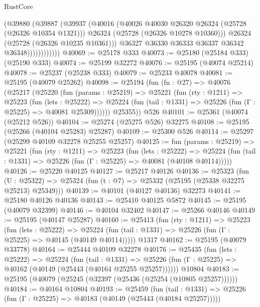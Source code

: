 \begin{lexlean}{RustCore}
\begin{coremodule}
                        (@39880
                          (@39887
                            (@39937
                              (@40016
                                (@40026 @40030 @26320 @26324 (@25728 (@26326 @10354 @1321)))
                                @26324
                                (@25728 (@26326 @10278 @10360)))
                              @26324
                              (@25728 (@26326 @10235 @10361)))
                            @36327
                            @36330
                            @36333
                            @36337
                            @36342
                            @36348))))))))))))
@40069 := @25178 @333
@40073 := @25180 (@25184 @333) (@25190 @333)
@40074 := @25199 @32272
@40076 := @25195 (@40074 @25214)
@40078 := @25237 (@25238 @333)
@40079 := @25233 @40078
@40081 := @25195 (@40079 @25262)
@40098 := @25194
    (fun (fn : @27) =>
    @40076
      (@25217
        (@25220
          (fun (params : @25219) =>
          @25221
            (fun (rty : @1211) =>
            @25223
              (fun (lets : @25222) =>
              @25224 (fun (tail : @1331) => @25226 (fun (Γ : @25225) => @40081 @25309))))))
        @25355))
    @526
@40101 := @25361 (@40074 (@25212 @526))
@40104 := @25274 (@25275 @526) @32275
@40108 := @25195 (@25266 (@40104 @25283) @25287)
@40109 := @25300 @526
@40114 := @25297 (@25299 @40109 @32278 @25255 @25257)
@40125 := fun (params : @25219) =>
  @25221
    (fun (rty : @1211) =>
    @25223
      (fun (lets : @25222) =>
      @25224 (fun (tail : @1331) => @25226 (fun (Γ : @25225) => @40081 (@40108 @40114)))))
@40126 := @25220 @40125
@40127 := @25217 @40126
@40136 := @25323
    (fun (U : @25322) => @25324 (fun (t : @7) => @25332 (@25195 (@25338 @32275 @25213) @25349)))
@40139 := @40101 (@40127 @40136) @32273
@40141 := @25180 @40126 @40136
@40143 := @25410 @40125 @5872
@40145 := @25195 (@40079 @32399)
@40146 := @40104 @32402
@40147 := @25266 @40146
@40149 := @25195 (@40147 @25287)
@40160 := @25413
    (fun (rty : @1211) =>
    @25223
      (fun (lets : @25222) =>
      @25224 (fun (tail : @1331) => @25226 (fun (Γ : @25225) => @40145 (@40149 @40114)))))
    @1317
@40162 := @25195 (@40079 @33778)
@40164 := @25444 @40109 @32278
@40176 := @25435
    (fun (lets : @25222) =>
    @25224
      (fun (tail : @1331) =>
      @25226 (fun (Γ : @25225) => @40162 (@40149 (@25443 (@40164 @25255 @25257))))))
    @10804
@40183 := @25195 (@40079 (@25245 (@32397 (@25436 (@25254 (@10805 @25257))))))
@40184 := @40164 @10804
@40193 := @25459
    (fun (tail : @1331) => @25226 (fun (Γ : @25225) => @40183 (@40149 (@25443 (@40184 @25257)))))

\end{coremodule}
\end{lexlean}
